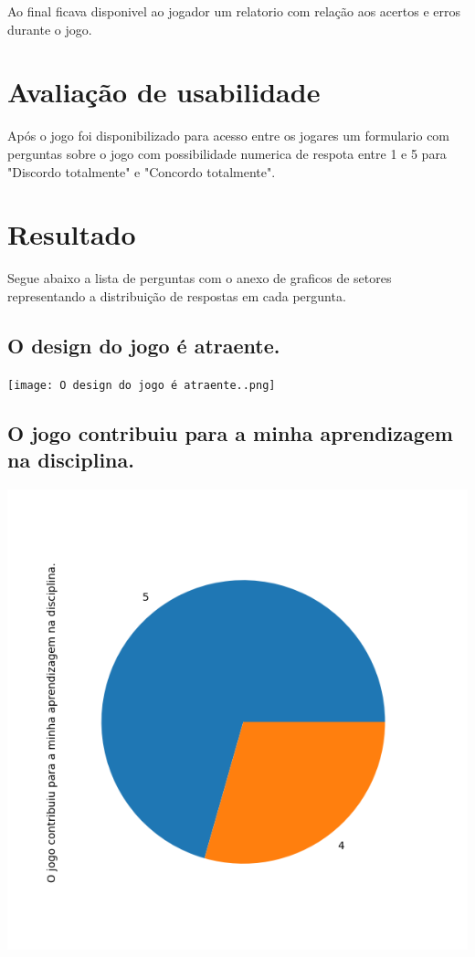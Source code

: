 \documentclass[12pt]{article}
\begin{document}
Ao final ficava disponivel ao jogador um relatorio com relação aos acertos e erros durante o jogo.

\section{Avaliação de usabilidade}

Após o jogo foi disponibilizado para acesso entre os jogares um formulario com perguntas sobre o jogo com possibilidade numerica de respota entre 1 e 5 para "Discordo totalmente" e "Concordo totalmente".

\section{Resultado}

Segue abaixo a lista de perguntas com o anexo de graficos de setores representando a distribuição de respostas em cada pergunta.

\subsection{O design do jogo é atraente.}

\begin{center}
  \texttt{[image: O design do jogo é atraente..png]}
\end{center}

\subsection{O jogo contribuiu para a minha aprendizagem na disciplina.}

\begin{center}
  \includegraphics[scale=0.4]{O jogo contribuiu para a minha aprendizagem na disciplina..png}
\end{center}
\end{document}
